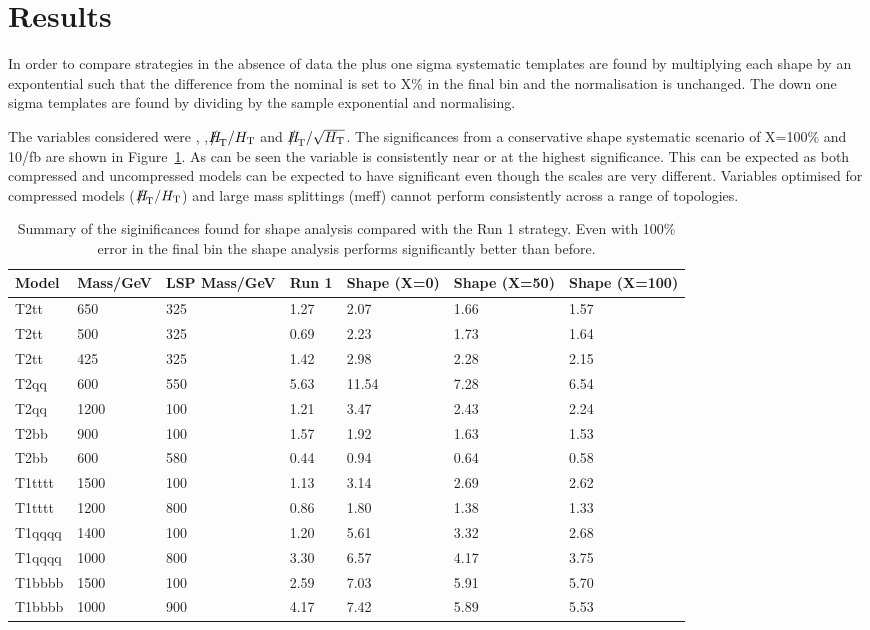 \section{Results}

In order to compare strategies in the absence of data the plus one sigma systematic
templates are found by multiplying each shape by an expontential such that 
the difference from the nominal is set to X\% in the final bin 
and the normalisation is unchanged. The down one sigma templates are found by 
dividing by the sample exponential and normalising.

The variables considered were \alphat, \mht,$\mht/\scalht$ and $\mht/\sqrt{\scalht}$.
The significances from a conservative shape systematic scenario of X=100\% and 10/fb are shown
in Figure~\ref{}. As can be seen the \mht variable is consistently near or at the highest 
significance. This can be expected as both compressed and uncompressed models can be expected 
to have significant \mht even though the \scalht scales are very different. Variables optimised
for compressed models ($\mht/\scalht$) and large mass splittings (meff) cannot perform consistently
across a range of topologies.

\begin{table}[!h]
  \caption{Summary of the siginificances found for shape analysis compared
    with the Run 1 strategy. Even with 100\% error in the final bin
  the shape analysis performs significantly better than before.}
  \centering
  \footnotesize
  \begin{tabular}{ l | l | l | l | l | l | l }
    Model & Mass/GeV & LSP Mass/GeV & Run 1 & Shape (X=0) & Shape (X=50) & Shape (X=100) \\ \hline
    T2tt & 650 & 325 & 1.27 & 2.07& 1.66 & 1.57 \\ 
    T2tt & 500 & 325 & 0.69 & 2.23 & 1.73 & 1.64 \\ 
    T2tt & 425 & 325 & 1.42 & 2.98 & 2.28 & 2.15 \\ 
    T2qq & 600 & 550 & 5.63 & 11.54 & 7.28 & 6.54 \\ 
    T2qq & 1200 & 100 & 1.21 & 3.47 & 2.43 & 2.24 \\ 
    T2bb & 900 & 100 & 1.57 & 1.92 & 1.63 & 1.53 \\ 
    T2bb & 600 & 580 & 0.44 & 0.94 & 0.64 & 0.58 \\ 
    T1tttt & 1500 & 100 & 1.13 & 3.14 & 2.69 & 2.62 \\ 
    T1tttt & 1200 & 800 & 0.86 & 1.80& 1.38 & 1.33 \\ 
    T1qqqq & 1400 & 100 & 1.20 & 5.61 & 3.32 & 2.68 \\ 
    T1qqqq & 1000 & 800 & 3.30 & 6.57 & 4.17 & 3.75 \\ 
    T1bbbb & 1500 & 100 & 2.59 & 7.03 & 5.91 & 5.70 \\ 
    T1bbbb & 1000 & 900 & 4.17 & 7.42 & 5.89 & 5.53 \\ 
  \end{tabular}
\end{table}

